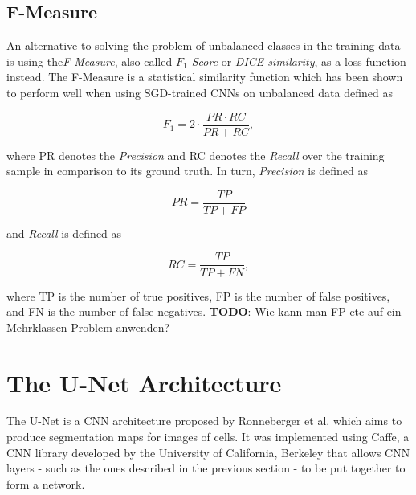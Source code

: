 		\subsection{F-Measure}

An alternative to solving the problem of unbalanced classes in the training data is using the\textit{F-Measure}, also called $F_1$\textit{-Score} or \textit{DICE similarity}, as a loss function instead. The F-Measure is a statistical similarity function which has been shown to perform well when using SGD-trained CNNs on unbalanced data\cite{fmeasure3}\cite{fmeasure4}\cite{fmeasure5} defined as

\[F_1 = 2 \cdot \frac{PR \cdot RC}{PR + RC},\]

\noindent where PR denotes the \textit{Precision} and RC denotes the \textit{Recall} over the training sample in comparison to its ground truth. In turn, \textit{Precision} is defined as

\[PR = \frac{TP}{TP + FP}\]

\noindent and \textit{Recall} is defined as

\[RC = \frac{TP}{TP + FN},\]

\noindent where TP is the number of true positives, FP is the number of false positives, and FN is the number of false negatives. \textbf{TODO}: Wie kann man FP etc auf ein Mehrklassen-Problem anwenden?

	\section {The U-Net Architecture}
The U-Net is a CNN architecture proposed by Ronneberger et al.\cite{unet} which aims to produce segmentation maps for images of cells. It was implemented using Caffe\cite{caffe}, a CNN library developed by the University of California, Berkeley that allows CNN layers - such as the ones described in the previous section - to be put together to form a network.

